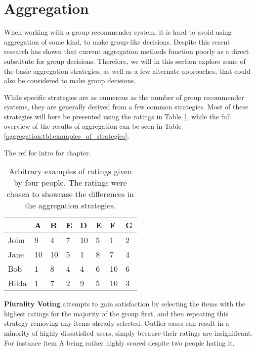 \section{Aggregation} \label{bg:aggregation}
When working with a group recommender system, it is hard to avoid using aggregation of some kind, to make group-like decisions. Despite this resent research has shown that current aggregation methods function poorly as a direct substitute for group decisions\cite{aggregationnotenough}. Therefore, we will in this section explore some of the basic aggregation strategies, as well as a few alternate approaches, that could also be considered to make group decisions.

While specific strategies are as numerous as the number of group recommender systems, they are generally derived from a few common strategies\cite{recsyshandbookagreggation}. Most of these strategies will here be presented using the ratings in Table \ref{aggregation:tbl:table_of_ratings}, while the full overview of the results of aggregation can be seen in Table \ref{aggregation:tbl:examples_of_strategies}.

The ref for intro for chapter\cite{recsyshandbookagreggation}.

\begin{table}[H]
	\centering
	\begin{tabular}{ | p{2cm} | p{1cm} | p{1cm} | p{1cm} | p{1cm} | p{1cm} | p{1cm} | p{1cm} | } \hline
		 & \textbf{A} & \textbf{B} & \textbf{E} & \textbf{D} & \textbf{E} & \textbf{F} & \textbf{G}  \\ \hline
		John & 9 & 4 & 7 & 10 & 5 & 1 & 2 \\ \hline
		Jane & 10 & 10 & 5 & 1 & 8 & 7 & 4 \\ \hline
		Bob & 1 & 8 & 4 & 4 & 6 & 10 & 6 \\ \hline
		Hilda & 1 & 7 & 2 & 9 & 5 & 10 & 3 \\ \hline
	\end{tabular}
	\caption{Arbitrary examples of ratings given by four people. The ratings were chosen to showcase the differences in the aggregation strategies.}
	\label{aggregation:tbl:table_of_ratings}
\end{table}

\textbf{Plurality Voting} attempts to gain satisfaction by selecting the items with the highest ratings for the majority of the group first, and then repeating this strategy removing any items already selected. Outlier cases can result in a minority of highly dissatisfied users, simply because their ratings are insignificant. For instance item A being rather highly scored despite two people hating it.\\

